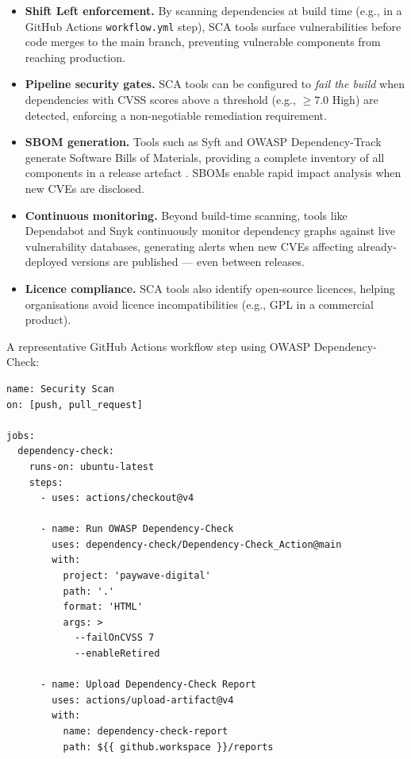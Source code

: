 \documentclass[12pt,a4paper]{article}
\begin{document}
\begin{itemize}
  \item \textbf{Shift Left enforcement.} By scanning dependencies at build time (e.g.,
    in a GitHub Actions \texttt{workflow.yml} step), SCA tools surface vulnerabilities
    before code merges to the main branch, preventing vulnerable components from
    reaching production.

  \item \textbf{Pipeline security gates.} SCA tools can be configured to \textit{fail
    the build} when dependencies with CVSS scores above a threshold (e.g., $\geq 7.0$
    High) are detected, enforcing a non-negotiable remediation requirement.

  \item \textbf{SBOM generation.} Tools such as Syft and OWASP Dependency-Track generate
    Software Bills of Materials, providing a complete inventory of all components in a
    release artefact \citep{ntia2021sbom}. SBOMs enable rapid impact analysis when new
    CVEs are disclosed.

  \item \textbf{Continuous monitoring.} Beyond build-time scanning, tools like
    Dependabot and Snyk continuously monitor dependency graphs against live vulnerability
    databases, generating alerts when new CVEs affecting already-deployed versions are
    published --- even between releases.

  \item \textbf{Licence compliance.} SCA tools also identify open-source licences,
    helping organisations avoid licence incompatibilities (e.g., GPL in a commercial
    product).
\end{itemize}

A representative GitHub Actions workflow step using OWASP Dependency-Check:

\begin{lstlisting}[caption={GitHub Actions SCA step using OWASP Dependency-Check}]
name: Security Scan
on: [push, pull_request]

jobs:
  dependency-check:
    runs-on: ubuntu-latest
    steps:
      - uses: actions/checkout@v4

      - name: Run OWASP Dependency-Check
        uses: dependency-check/Dependency-Check_Action@main
        with:
          project: 'paywave-digital'
          path: '.'
          format: 'HTML'
          args: >
            --failOnCVSS 7
            --enableRetired

      - name: Upload Dependency-Check Report
        uses: actions/upload-artifact@v4
        with:
          name: dependency-check-report
          path: ${{ github.workspace }}/reports
\end{lstlisting}
\end{document}
